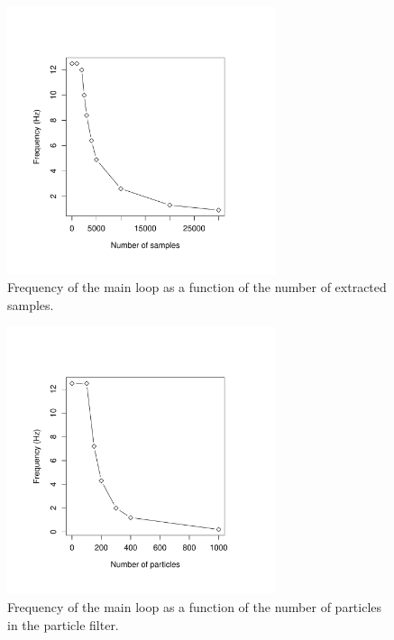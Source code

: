 \documentclass[11pt]{report}
\begin{document}
\begin{figure}[h]
  \centering
  \includegraphics[width=0.7\textwidth]{samples_vs_freq}
  \caption{Frequency of the main loop as a function of the number of extracted samples.}
  \label{fig:freqsam}
\end{figure}

\begin{figure}[h]
  \centering
\includegraphics[width=0.7\textwidth]{particles_vs_freq}
  \caption{Frequency of the main loop as a function of the number of
    particles in the particle filter.}
  \label{fig:freqpart}
\end{figure}
\end{document}

